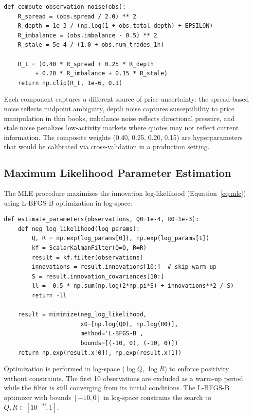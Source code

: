 \documentclass[11pt, a4paper]{article}
\begin{document}
\begin{lstlisting}[style=python, caption={Composite observation noise estimation (\texttt{noise\_estimation.py}).}]
def compute_observation_noise(obs):
    R_spread = (obs.spread / 2.0) ** 2
    R_depth = 1e-3 / (np.log(1 + obs.total_depth) + EPSILON)
    R_imbalance = (obs.imbalance - 0.5) ** 2
    R_stale = 5e-4 / (1.0 + obs.num_trades_1h)

    R_t = (0.40 * R_spread + 0.25 * R_depth
         + 0.20 * R_imbalance + 0.15 * R_stale)
    return np.clip(R_t, 1e-6, 0.1)
\end{lstlisting}

Each component captures a different source of price uncertainty: the spread-based noise reflects midpoint ambiguity, depth noise captures susceptibility to price manipulation in thin books, imbalance noise reflects directional pressure, and stale noise penalizes low-activity markets where quotes may not reflect current information. The composite weights (0.40, 0.25, 0.20, 0.15) are hyperparameters that would be calibrated via cross-validation in a production setting.

\subsection{Maximum Likelihood Parameter Estimation}

The MLE procedure maximizes the innovation log-likelihood (Equation~\ref{eq:mle}) using L-BFGS-B optimization in log-space:

\begin{lstlisting}[style=python, caption={MLE parameter estimation (\texttt{parameter\_estimation.py}).}]
def estimate_parameters(observations, Q0=1e-4, R0=1e-3):
    def neg_log_likelihood(log_params):
        Q, R = np.exp(log_params[0]), np.exp(log_params[1])
        kf = ScalarKalmanFilter(Q=Q, R=R)
        result = kf.filter(observations)
        innovations = result.innovations[10:]  # skip warm-up
        S = result.innovation_covariances[10:]
        ll = -0.5 * np.sum(np.log(2*np.pi*S) + innovations**2 / S)
        return -ll

    result = minimize(neg_log_likelihood,
                      x0=[np.log(Q0), np.log(R0)],
                      method='L-BFGS-B',
                      bounds=[(-10, 0), (-10, 0)])
    return np.exp(result.x[0]), np.exp(result.x[1])
\end{lstlisting}

Optimization is performed in log-space ($\log Q$, $\log R$) to enforce positivity without constraints. The first 10 observations are excluded as a warm-up period while the filter is still converging from its initial conditions. The L-BFGS-B optimizer with bounds $[-10, 0]$ in log-space constrains the search to $Q, R \in [10^{-10}, 1]$.
\end{document}
